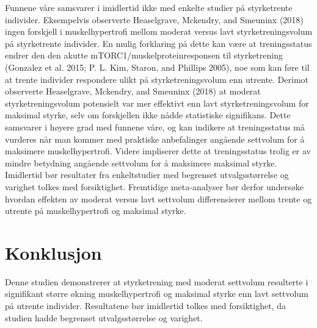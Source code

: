 \documentclass[
  letterpaper,
  DIV=11,
  numbers=noendperiod]{scrreprt}
\begin{document}
Funnene våre samsvarer i imidlertid ikke med enkelte studier på
styrketrente individer. Eksempelvis observerte Heaselgrave, Mckendry,
and Smeuninx (2018) ingen forskjell i muskelhypertrofi mellom moderat
versus lavt styrketreningsvolum på styrketrente individer. En mulig
forklaring på dette kan være at treningsstatus endrer den den akutte
mTORC1/muskelproteinresponsen til styrketrening (Gonzalez et al. 2015;
P. L. Kim, Staron, and Phillips 2005), noe som kan føre til at trente
individer respondere ulikt på styrketreningsvolum enn utrente. Derimot
observerte Heaselgrave, Mckendry, and Smeuninx (2018) at moderat
styrketreningsvolum potensielt var mer effektivt enn lavt
styrketreningsvolum for maksimal styrke, selv om forskjellen ikke nådde
statistiske signifikans. Dette samsvarer i høyere grad med funnene våre,
og kan indikere at treningsstatus må vurderes når man kommer med
praktiske anbefalinger angående settvolum for å maksimere
muskelhypertrofi. Videre impliserer dette at treningsstatus trolig er av
mindre betydning angående settvolum for å maksimere maksimal styrke.
Imidlertid bør resultater fra enkeltstudier med begrenset
utvalgsstørrelse og varighet tolkes med forsiktighet. Fremtidige
meta-analyser bør derfor undersøke hvordan effekten av moderat versus
lavt settvolum differensierer mellom trente og utrente på
muskelhypertrofi og maksimal styrke.

\hypertarget{konklusjon-1}{%
\section{Konklusjon}\label{konklusjon-1}}

Denne studien demonstrerer at styrketrening med moderat settvolum
resulterte i signifikant større økning muskelhypertrofi og maksimal
styrke enn lavt settvolum på utrente individer. Resultatene bør
imidlertid tolkes med forsiktighet, da studien hadde begrenset
utvalgsstørrelse og varighet.
\end{document}
